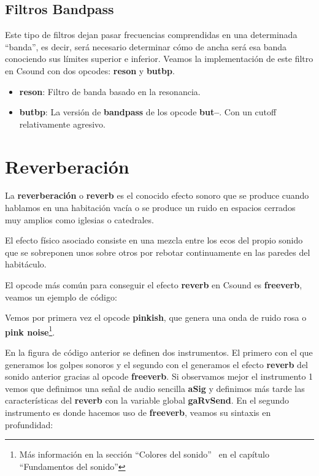 \subsection{Filtros Bandpass}
Este tipo de filtros dejan pasar frecuencias comprendidas en una determinada ``banda'', es decir, será necesario determinar cómo de ancha será esa banda conociendo sus límites superior e inferior. Veamos la implementación de este filtro en Csound con dos opcodes: \textbf{reson} y \textbf{butbp}.
\begin{itemize}
 \item \textbf{reson}: Filtro de banda basado en la resonancia.
 \item \textbf{butbp}: La versión de \textbf{bandpass} de los opcode \textbf{but--}. Con un cutoff relativamente agresivo. 
\end{itemize}

\section{Reverberación}
La \textbf{reverberación} o \textbf{reverb} es el conocido efecto sonoro que se produce cuando hablamos en una habitación vacía o se produce un ruido en espacios cerrados muy amplios como iglesias o catedrales. 

El efecto físico asociado consiste en una mezcla entre los ecos del propio sonido que se sobreponen unos sobre otros por rebotar continuamente en las paredes del habitáculo.

El opcode más común para conseguir el efecto \textbf{reverb} en Csound es \textbf{freeverb}, veamos un ejemplo de código:


Vemos por primera vez el opcode \textbf{pinkish}, que genera una onda de ruido rosa o \textbf{pink noise}\footnote{Más información en la sección ``Colores del sonido'' \ en el capítulo ``Fundamentos del sonido''}.
 
En la figura de código anterior se definen dos instrumentos. El primero con el que generamos los golpes sonoros y el segundo con el generamos el efecto \textbf{reverb} del sonido anterior gracias al opcode \textbf{freeverb}. Si observamos mejor el instrumento 1 vemos que definimos una señal de audio sencilla \textbf{aSig} y definimos más tarde las características del \textbf{reverb} con la variable global \textbf{gaRvSend}. En el segundo instrumento es donde hacemos uso de \textbf{freeverb}, veamos su sintaxis en profundidad: 

